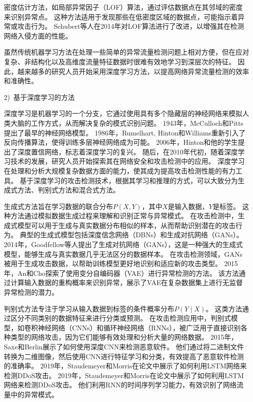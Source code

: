 密度估计方法，如局部异常因子（LOF）算法，通过评估数据点在其邻域的密度来识别异常点。
这种方法适用于发现那些在低密度区域的数据点，可能指示着异常或攻击行为。
Schubert等人\cite{schubert2014local}在2014年对LOF算法进行了改进，以增强其在检测网络入侵方面的性能。

虽然传统机器学习方法在处理一些简单的异常流量检测问题上相对方便，但在应对复杂、非结构化以及高维度流量特征数据时很难有效地学习到深层次的特征。
因此，越来越多的研究人员开始采用深度学习方法，以提高网络异常流量检测的效率和准确性。\par

2)~基于深度学习的方法\par
深度学习是机器学习的一个分支，它通过使用具有多个隐藏层的神经网络来模拟人类大脑的工作方式，从而解决复杂的模式识别问题。
1943年，McCulloch和Pitts提出了最早的神经网络模型。
1986年，Rumelhart, Hinton和Williams重新引入了反向传播算法，使得训练多层神经网络成为可能。
2006年，Hinton和他的学生提出了深度置信网络，标志着深度学习的复兴。
随后，在2010年代初，随着深度学习技术的发展，研究人员开始探索其在网络安全和攻击检测中的应用。
深度学习在处理和分析大规模复杂数据方面的能力，使其成为提高攻击检测性能的有力工具。
基于深度学习的攻击检测技术，根据其学习和推理的方式，可以大致分为生成式方法、判别式方法和混合式方法。

生成式方法旨在学习数据的联合分布$P(X,Y)$，其中$X$是输入数据，$Y$是标签。
这种方法通过模拟数据生成过程来理解和识别正常与异常模式。
在攻击检测中，生成式模型可以用于生成与真实数据分布相似的样本，从而帮助识别潜在的攻击行为。
典型的生成式模型包括深度信念网络（DBNs）和生成对抗网络（GANs）。
2014年，Goodfellow等人提出了生成对抗网络（GANs）\cite{goodfellow2014generative}，这是一种强大的生成式模型，能够生成与真实数据几乎无法区分的数据样本。
在攻击检测领域，GANs被用于生成攻击数据，以帮助训练模型更好地识别和适应新的攻击类型。
2015年，An和Cho探索了使用变分自编码器（VAE）进行异常检测的方法\cite{an2015variational}。
该方法通过计算输入数据的重构概率来识别异常，展示了VAE在复杂数据集上进行无监督异常检测的潜力。

判别式方法专注于学习从输入数据到标签的条件概率分布$P(Y∣X)$。
这类方法通过区分不同类别的数据特征来进行分类或预测。
在攻击检测应用中，判别式模型，如卷积神经网络（CNNs）和循环神经网络（RNNs），被广泛用于直接识别各种类型的网络攻击，因为它们能够有效处理和分析大量的网络数据。
2015年，Saxe和Berlin展示了如何使用深度CNN来检测恶意软件\cite{saxe2015deep}。
他们通过将二进制文件转换为二维图像，然后使用CNN进行特征学习和分类，有效提高了恶意软件检测的准确率。
2019年，Staudemeyer和Morris\cite{staudemeyer2019applying}在论文中展示了如何利用LSTM网络来检测DDoS攻击。
2019年，Staudemeyer和Morris\cite{staudemeyer2019applying}在论文中展示了如何利用LSTM网络来检测DDoS攻击。
他们利用RNN的时间序列学习能力，有效识别了网络流量中的异常模式。

